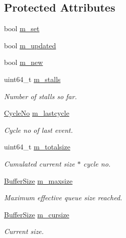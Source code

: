 \subsection*{Protected Attributes}
\begin{DoxyCompactItemize}
\item 
bool \hyperlink{class_simulator_1_1_flag_a60f78dd6656e2604ca110664c9c93afe}{m\+\_\+set}
\item 
bool \hyperlink{class_simulator_1_1_flag_a55920339c74aba5925837e4374d54c9a}{m\+\_\+updated}
\item 
bool \hyperlink{class_simulator_1_1_flag_a996f9430e3c53ad4b1ffe7e5dab05bd6}{m\+\_\+new}
\item 
uint64\+\_\+t \hyperlink{class_simulator_1_1_flag_aa341af9a7119e56d6e56340d0f6dcd72}{m\+\_\+stalls}
\begin{DoxyCompactList}\small\item\em Number of stalls so far. \end{DoxyCompactList}\item 
\hyperlink{namespace_simulator_a928f1e2101eba21bb0fe409e8c9ce573}{Cycle\+No} \hyperlink{class_simulator_1_1_flag_a036d407f68f820d78ecb30072af3c429}{m\+\_\+lastcycle}
\begin{DoxyCompactList}\small\item\em Cycle no of last event. \end{DoxyCompactList}\item 
uint64\+\_\+t \hyperlink{class_simulator_1_1_flag_a21873c168122e7ec34d5e4cfe9ba7c1f}{m\+\_\+totalsize}
\begin{DoxyCompactList}\small\item\em Cumulated current size $\ast$ cycle no. \end{DoxyCompactList}\item 
\hyperlink{namespace_simulator_a5ca279f926485be2d0554e41275a3305}{Buffer\+Size} \hyperlink{class_simulator_1_1_flag_ad7d35060575d980cd0532240fc61d177}{m\+\_\+maxsize}
\begin{DoxyCompactList}\small\item\em Maximum effective queue size reached. \end{DoxyCompactList}\item 
\hyperlink{namespace_simulator_a5ca279f926485be2d0554e41275a3305}{Buffer\+Size} \hyperlink{class_simulator_1_1_flag_a67bdcf6e60428f27966068a8d472c868}{m\+\_\+cursize}
\begin{DoxyCompactList}\small\item\em Current size. \end{DoxyCompactList}\end{DoxyCompactItemize}



